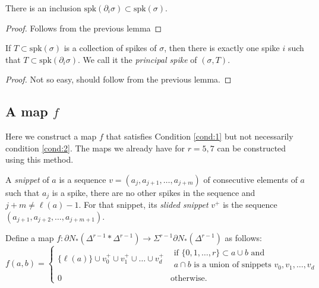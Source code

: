 \begin{lemma}
	There is an inclusion $\mathrm{spk}(\partial_i\sigma)\subset \mathrm{spk}(\sigma)$.
\end{lemma}

\begin{proof}
	Follows from the previous lemma
\end{proof}

\begin{lemma}
	If $T\subset \mathrm{spk}(\sigma)$ is a collection of spikes of $\sigma$, then there is exactly one spike $i$ such that $T\subset \mathrm{spk}(\partial_i\sigma)$. We call it the \emph{principal spike} of $(\sigma,T)$.
\end{lemma}

\begin{proof}
	Not so easy, should follow from the previous lemma.
\end{proof}

\subsection{A map $f$}

Here we construct a map $f$ that satisfies Condition \eqref{cond:1} but not necessarily condition \eqref{cond:2}. The maps we already have for $r=5,7$ can be constructed using this method.

\begin{definition}
	A \emph{snippet} of $a$ is a sequence $v = (a_j,a_{j+1},\ldots,a_{j+m})$ of consecutive elements of $a$ such that $a_j$ is a spike, there are no other spikes in the sequence and $j+m\neq \ell(a)-1$. For that snippet, its \emph{slided snippet} $v^+$ is the sequence $(a_{j+1},a_{j+2},\ldots,a_{j+m+1})$.
\end{definition}

Define a map $f\colon \partial N_*(\Delta^{r-1}*\Delta^{r-1})\to \Sigma^{r-1}\partial N_*(\Delta^{r-1})$ as follows:
\[
f(a,b) =
\begin{cases}
	\{\ell(a)\}\cup v_0^+\cup v_1^+\cup\ldots \cup v_d^+ & \begin{array}{l} \text{if $\{0,1,\ldots,r\}\subset a\cup b$ and} \\ \text{$a\cap b$ is a union of snippets $v_0,v_1,\ldots,v_d$}\end{array} \\
	0 & \text{otherwise.}
\end{cases}
\]

